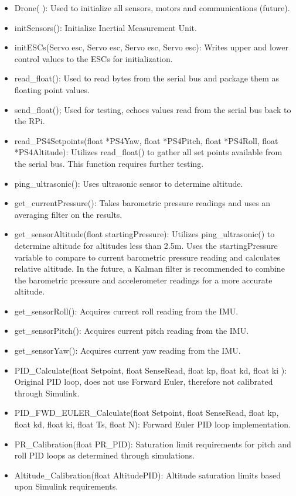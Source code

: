 \begin{itemize}
\item Drone( ): Used to initialize all sensors, motors and communications (future).
\item initSensors(): Initialize Inertial Measurement Unit.
\item initESCs(Servo esc, Servo esc, Servo esc, Servo esc): Writes upper and lower control values to the ESCs for initialization.
\item read\_float(): Used to read bytes from the serial bus and package them as floating point values.
\item send\_float(); Used for testing, echoes values read from the serial bus back to the RPi.
\item read\_PS4Setpoints(float *PS4Yaw, float *PS4Pitch, float *PS4Roll, float *PS4Altitude): Utilizes read\_float() to gather all set points available from the serial bus. This function requires further testing.
\item ping\_ultrasonic(): Uses ultrasonic sensor to determine altitude.
\item get\_currentPressure(): Takes barometric pressure readings and uses an averaging filter on the results.
\item get\_sensorAltitude(float startingPressure): Utilizes ping\_ultrasonic() to determine altitude for altitudes less than 2.5m. Uses the startingPressure variable to compare to current barometric pressure reading and calculates relative altitude. In the future, a Kalman filter is recommended to combine the barometric pressure and accelerometer readings for a more accurate altitude.
\item get\_sensorRoll(): Acquires current roll reading from the IMU.
\item get\_sensorPitch(): Acquires current pitch reading from the IMU.
\item get\_sensorYaw(): Acquires current yaw reading from the IMU.
\item PID\_Calculate(float Setpoint, float SenseRead, float kp, float kd, float ki ): Original PID loop, does not use Forward Euler, therefore not calibrated through Simulink.
\item PID\_FWD\_EULER\_Calculate(float Setpoint, float SenseRead, float kp, float kd, float ki, float Ts, float N): Forward Euler PID loop implementation.
\item PR\_Calibration(float PR\_PID): Saturation limit requirements for pitch and roll PID loops as determined through simulations.
\item Altitude\_Calibration(float AltitudePID): Altitude saturation limits based upon Simulink requirements.


\end{itemize}
